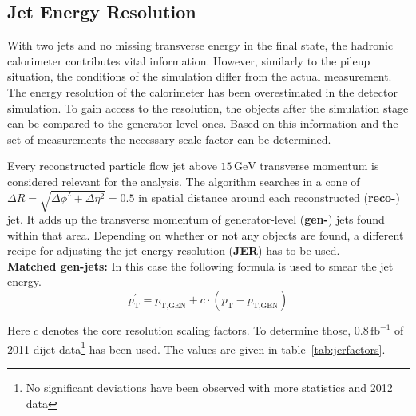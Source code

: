 \subsection{Jet Energy Resolution}
\label{sec:jer}

With two jets and no missing transverse energy in the final state, the hadronic calorimeter contributes vital information. However, similarly to the pileup situation, the conditions of the simulation differ from the actual measurement. The energy resolution of the calorimeter has been overestimated in the detector simulation. To gain access to the resolution, the objects after the simulation stage can be compared to the generator-level ones. Based on this information and the set of measurements the necessary scale factor can be determined.

Every reconstructed particle flow jet above $15\,\text{GeV}$ transverse momentum is considered relevant for the analysis. The algorithm searches in a cone of $\Delta R = \sqrt{\Delta\phi^2 + \Delta\eta^2} = 0.5$ in spatial distance around each reconstructed (\textbf{reco-}) jet. It adds up the transverse momentum of generator-level (\textbf{gen-}) jets found within that area. Depending on whether or not any objects are found, a different recipe for adjusting the jet energy resolution (\textbf{JER}) has to be used. \\


\textbf{Matched gen-jets:} In this case the following formula is used to smear the jet energy.
  \begin{equation}
    \label{eq:jermatched}
    p^\prime_{\text{T}} = p_{\text{T}, \text{GEN}} + c \cdot (p_{\text{T}} - p_{\text{T}, \text{GEN}})
  \end{equation}
  
  \noindent Here $c$ denotes the core resolution scaling factors. To determine those, $0.8\,\text{fb}^{-1}$ of 2011 dijet data\footnote{No significant deviations have been observed with more statistics and 2012 data} has been used. The values are given in table~\ref{tab:jerfactors}.

